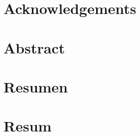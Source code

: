 
\cleartorecto
\chapter*{Acknowledgements}



\cleartorecto
\chapter{Abstract}



\cleartorecto
{}
\chapter*{Resumen}



\cleartorecto
{}
\chapter*{Resum}



%

